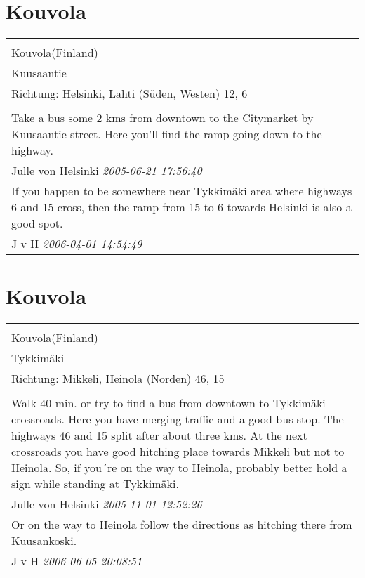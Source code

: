 \documentclass[a4paper,12pt]{article}
\begin{document}
\section{Kouvola}
\begin{tabular}{|p{13cm}|}
\hline\\
Kouvola(Finland)\\
Kuusaantie\\
Richtung: Helsinki, Lahti (Süden, Westen) 12, 6 \\
\hline\\
Take a bus some 2 kms from downtown to the Citymarket by Kuusaantie-street. Here you'll find the ramp going down to the highway. \\
Julle von Helsinki \textit{ 2005-06-21 17:56:40 }\\\hline If you happen to be somewhere near Tykkimäki area where highways 6 and 15 cross, then the ramp from 15 to 6 towards Helsinki is also a good spot. \\
J v H \textit{ 2006-04-01 14:54:49 }\\\hline
\end{tabular}


\section{Kouvola}
\begin{tabular}{|p{13cm}|}
\hline\\
Kouvola(Finland)\\
Tykkimäki\\
Richtung: Mikkeli, Heinola (Norden) 46, 15 \\
\hline\\
Walk 40 min. or try to find a bus from downtown to Tykkimäki-crossroads. Here you have merging traffic and a good bus stop. The highways 46 and 15 split after about three kms. At the next crossroads you have good hitching place towards Mikkeli but not to Heinola. So, if you´re on the way to Heinola, probably better hold a sign while standing at Tykkimäki. \\
Julle von Helsinki \textit{ 2005-11-01 12:52:26 }\\\hline Or on the way to Heinola follow the directions as hitching there from Kuusankoski. \\
J v H \textit{ 2006-06-05 20:08:51 }\\\hline
\end{tabular}
\end{document}
